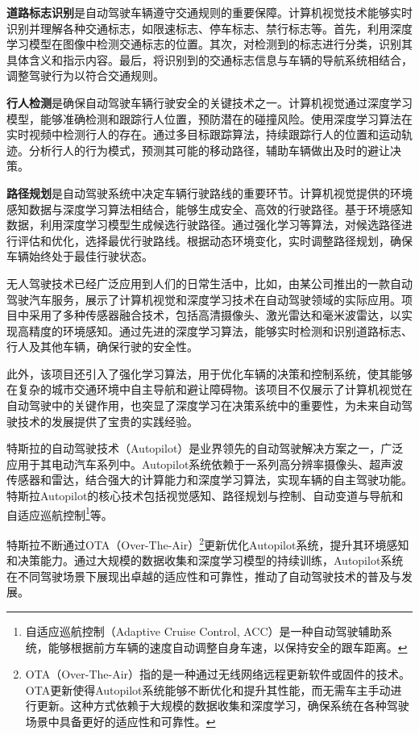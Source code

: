 \textbf{道路标志识别}是自动驾驶车辆遵守交通规则的重要保障。计算机视觉技术能够实时识别并理解各种交通标志，如限速标志、停车标志、禁行标志等。首先，利用深度学习模型在图像中检测交通标志的位置。其次，对检测到的标志进行分类，识别其具体含义和指示内容。最后，将识别到的交通标志信息与车辆的导航系统相结合，调整驾驶行为以符合交通规则。

\textbf{行人检测}是确保自动驾驶车辆行驶安全的关键技术之一。计算机视觉通过深度学习模型，能够准确检测和跟踪行人位置，预防潜在的碰撞风险。使用深度学习算法在实时视频中检测行人的存在。通过多目标跟踪算法，持续跟踪行人的位置和运动轨迹。分析行人的行为模式，预测其可能的移动路径，辅助车辆做出及时的避让决策。

\textbf{路径规划}是自动驾驶系统中决定车辆行驶路线的重要环节。计算机视觉提供的环境感知数据与深度学习算法相结合，能够生成安全、高效的行驶路径。基于环境感知数据，利用深度学习模型生成候选行驶路径。通过强化学习等算法，对候选路径进行评估和优化，选择最优行驶路线。根据动态环境变化，实时调整路径规划，确保车辆始终处于最佳行驶状态。

无人驾驶技术已经广泛应用到人们的日常生活中，比如，由某公司推出的一款自动驾驶汽车服务，展示了计算机视觉和深度学习技术在自动驾驶领域的实际应用。项目中采用了多种传感器融合技术，包括高清摄像头、激光雷达和毫米波雷达，以实现高精度的环境感知。通过先进的深度学习算法，能够实时检测和识别道路标志、行人及其他车辆，确保行驶的安全性。

此外，该项目还引入了强化学习算法，用于优化车辆的决策和控制系统，使其能够在复杂的城市交通环境中自主导航和避让障碍物。该项目不仅展示了计算机视觉在自动驾驶中的关键作用，也突显了深度学习在决策系统中的重要性，为未来自动驾驶技术的发展提供了宝贵的实践经验。

特斯拉的自动驾驶技术（Autopilot）是业界领先的自动驾驶解决方案之一，广泛应用于其电动汽车系列中。Autopilot系统依赖于一系列高分辨率摄像头、超声波传感器和雷达，结合强大的计算能力和深度学习算法，实现车辆的自主驾驶功能。
特斯拉Autopilot的核心技术包括视觉感知、路径规划与控制、自动变道与导航和自适应巡航控制\footnote{自适应巡航控制（Adaptive Cruise Control, ACC）是一种自动驾驶辅助系统，能够根据前方车辆的速度自动调整自身车速，以保持安全的跟车距离。}等。

特斯拉不断通过OTA（Over-The-Air）\footnote{OTA（Over-The-Air）指的是一种通过无线网络远程更新软件或固件的技术。OTA更新使得Autopilot系统能够不断优化和提升其性能，而无需车主手动进行更新。这种方式依赖于大规模的数据收集和深度学习，确保系统在各种驾驶场景中具备更好的适应性和可靠性。}更新优化Autopilot系统，提升其环境感知和决策能力。通过大规模的数据收集和深度学习模型的持续训练，Autopilot系统在不同驾驶场景下展现出卓越的适应性和可靠性，推动了自动驾驶技术的普及与发展。

